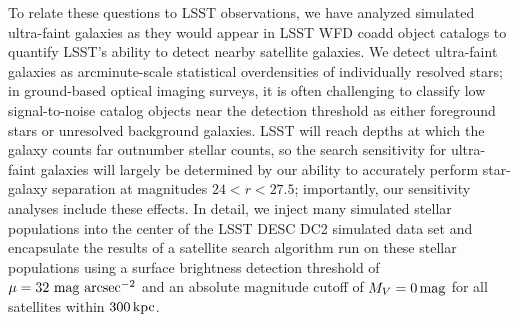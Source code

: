 To relate these questions to LSST observations, we have analyzed simulated ultra-faint galaxies as they would appear in LSST WFD coadd object catalogs to quantify LSST's ability to detect nearby satellite galaxies. %
We detect ultra-faint galaxies as arcminute-scale statistical overdensities of individually resolved stars; in ground-based optical imaging surveys, it is often challenging to classify low signal-to-noise catalog objects near the detection threshold as either foreground stars or unresolved background galaxies. LSST will reach depths at which the galaxy counts far outnumber stellar counts, so the search sensitivity for ultra-faint galaxies will largely be determined by our ability to accurately perform star-galaxy separation at magnitudes $24 < r < 27.5$; importantly, our sensitivity analyses include these effects. 
In detail, we inject many simulated stellar populations into the center of the LSST DESC DC2 simulated data set and encapsulate the results of a satellite search algorithm run on these stellar populations using a surface brightness detection threshold of $\mu = 32\ \rm{mag\ arcsec}^{-2}$ \citep{0912.0201} and an absolute magnitude cutoff of $M_V = 0\mathrm{\,mag}$ for all satellites within $300\mathrm{\,kpc}$.

